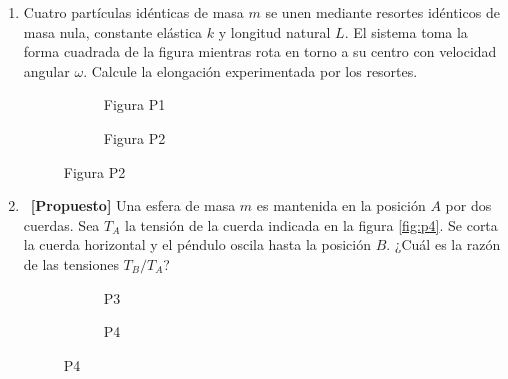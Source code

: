 \documentclass[letterpaper,11pt]{article}
\begin{document}
\begin{enumerate}
\item Cuatro partículas idénticas de masa $m$ se unen mediante resortes idénticos de masa nula, constante elástica $k$ y longitud natural $L$. El sistema toma la forma cuadrada de la figura mientras rota en torno a su centro con velocidad angular $\omega$. Calcule la elongación experimentada por los resortes.

\begin{figure}[H]
    \centering
    \begin{subfigure}[t]{0.45\textwidth}
        \centering
        
        \caption*{Figura P1}
    \end{subfigure}
    \hspace{0.1em}
    \begin{subfigure}[t]{0.45\textwidth}
        \centering
        
        \caption*{Figura P2}
    \end{subfigure}
\end{figure}


\item~\textbf{[Propuesto]} Una esfera de masa $m$ es mantenida en la posición $A$ por dos cuerdas. Sea $T_A$ la tensión de la cuerda indicada en la figura \ref{fig:p4}. Se corta la cuerda horizontal y el péndulo oscila hasta la posición $B$. ¿Cuál es la razón de las tensiones $T_B/T_A$?

\begin{figure}[H]
    \centering
    \begin{subfigure}[t]{0.42\textwidth}
        \centering
        
        \caption{P3}
        \label{P3}
    \end{subfigure}
    \hspace{0.5em}
    \begin{subfigure}[t]{0.42\textwidth}
        \centering
        
        \caption{P4}
        \label{P4}
    \end{subfigure}
\end{figure}



%   

\end{enumerate}
\end{document}
